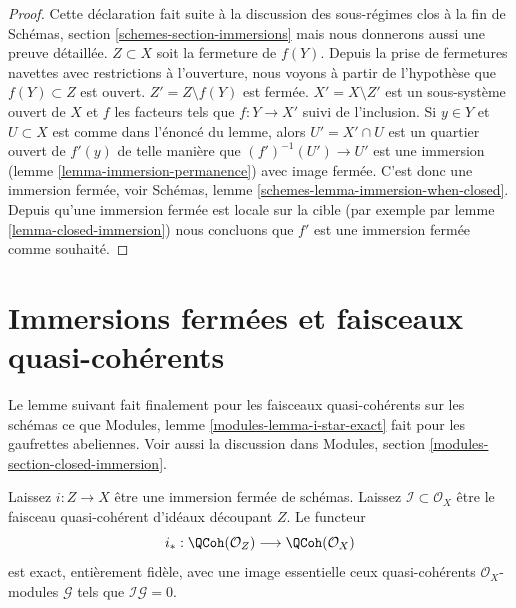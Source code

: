 \begin{proof}

Cette déclaration fait suite à la discussion des sous-régimes clos à la fin de Schémas, section \ref{schemes-section-immersions}
mais nous donnerons aussi une preuve détaillée. $Z \subset X$ soit la fermeture de $f(Y)$. Depuis la prise de fermetures navettes avec restrictions à l'ouverture, nous voyons à partir de l'hypothèse que
$f(Y) \subset Z$ est ouvert. $Z' = Z \setminus f(Y)$ est fermée. $X' = X \setminus Z'$ est un sous-système ouvert de $X$ et
$f$ les facteurs tels que $f : Y \to X'$ suivi de l'inclusion. Si $y \in Y$ et $U \subset X$ est comme dans l'énoncé du lemme, alors $U' = X' \cap U$ est un quartier ouvert de $f'(y)$ de telle manière que $(f')^{-1}(U') \to U'$ est une immersion (lemme \ref{lemma-immersion-permanence}) avec image fermée. C'est donc une immersion fermée, voir Schémas, lemme \ref{schemes-lemma-immersion-when-closed}. Depuis qu'une immersion fermée est locale sur la cible (par exemple par lemme \ref{lemma-closed-immersion}) nous concluons que $f'$ est une immersion fermée comme souhaité.

\end{proof}








\section{Immersions fermées et faisceaux quasi-cohérents}
\label{section-closed-immersions-quasi-coherent}

\noindent
Le lemme suivant fait finalement pour les faisceaux quasi-cohérents sur les schémas ce que Modules, lemme \ref{modules-lemma-i-star-exact} fait pour les gaufrettes abeliennes. Voir aussi la discussion dans Modules, section \ref{modules-section-closed-immersion}.

\begin{lemma}

\label{lemma-i-star-equivalence}
Laissez $i : Z \to X$ être une immersion fermée de schémas. Laissez $\mathcal{I} \subset \mathcal{O}_X$ être le faisceau quasi-cohérent d'idéaux découpant $Z$. Le functeur $$
i_* :
\QCoh(\mathcal{O}_Z)
\longrightarrow
\QCoh(\mathcal{O}_X)
$$ est exact, entièrement fidèle, avec une image essentielle ceux quasi-cohérents $\mathcal{O}_X$-modules $\mathcal{G}$ tels que $\mathcal{I}\mathcal{G} = 0$.
\end{lemma}

